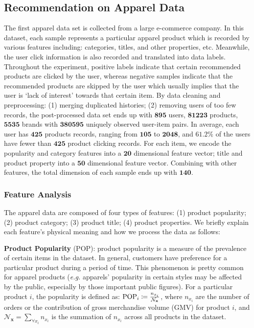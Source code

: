 {\subsection{Recommendation on Apparel Data}
The first apparel data set is collected from a large e-commerce company.  In this dataset, each sample represents a particular apparel product which is recorded by various features including: categories, titles, and other properties, etc.  Meanwhile, the user click information is also recorded and translated into data labels. Throughout the experiment, positive labels indicate that certain recommended products are clicked by the user, whereas negative samples indicate that the recommended products are skipped by the user which usually implies that the user is `lack of interest' towards that certain item.  By data cleaning and preprocessing: (1) merging duplicated histories; (2) removing users of too few records, the post-processed data set ends up with $\mathbf{895}$ users, $\mathbf{81223}$ products, $\mathbf{5535}$ brands with $\mathbf{380595}$ uniquely observed user-item pairs.  In average, each user has $\mathbf{425}$ products records, ranging from $\mathbf{105}$ to $\mathbf{2048}$, and $\mathbf{61.2\%}$ of the users have fewer than $\mathbf{425}$ product clicking records.  For each item, we encode the popularity and category features into a $\mathbf{20}$ dimensional feature vector; title and product property into a $\mathbf{50}$ dimensional feature vector.  Combining with other features, the total dimension of each sample ends up with $\mathbf{140}$.

\subsubsection{Feature Analysis}
The apparel data are composed of four types of features: (1) product popularity; (2) product category; (3) product title; (4) product properties.  We briefly explain each feature's physical meaning and how we process the data as follows:

\textbf{Product Popularity} (POP): product popularity is a measure of the prevalence of certain items in the dataset. In general, customers have preference for a particular product during a period of time. This phenomenon is pretty common for apparel products (\emph{e.g.} apparels' popularity in certain styles may be affected by the public, especially by those important public figures). For a particular product $i$, the popularity is defined as: $\mathrm{\scriptsize POP}_{i} \coloneqq \frac{n_{x_i}}{\mathcal{N}_\mathbf{x}}$, where $n_{x_i}$ are the number of orders or the contribution of gross merchandise volume (GMV) for product $i$,  and $\mathcal{N}_\mathbf{x} = \sum_{\forall x_i}n_{x_i}$ is the summation of $n_{x_i}$ across all products in the dataset. \newline

}
